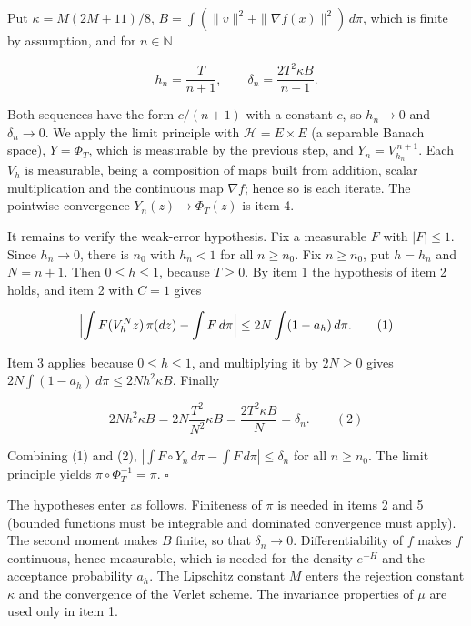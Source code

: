\documentclass[11pt,a4paper]{article}
\begin{document}
Put \(\kappa=M(2M+11)/8\), \(B=\int(\|v\|^2+\|\nabla f(x)\|^2)\,d\pi\), which is finite by assumption, and for \(n\in\mathbb N\)


\[h_n=\frac{T}{n+1},\qquad \delta_n=\frac{2T^2\kappa B}{n+1}.\]


Both sequences have the form \(c/(n+1)\) with a constant \(c\), so \(h_n\to0\) and \(\delta_n\to0\). We apply the limit principle with \(\mathcal H=E\times E\) (a separable Banach space), \(Y=\Phi_T\), which is measurable by the previous step, and \(Y_n=V_{h_n}^{\,n+1}\). Each \(V_h\) is measurable, being a composition of maps built from addition, scalar multiplication and the continuous map \(\nabla f\); hence so is each iterate. The pointwise convergence \(Y_n(z)\to\Phi_T(z)\) is item 4.




It remains to verify the weak-error hypothesis. Fix a measurable \(F\) with \(|F|\le1\). Since \(h_n\to0\), there is \(n_0\) with \(h_n<1\) for all \(n\ge n_0\). Fix \(n\ge n_0\), put \(h=h_n\) and \(N=n+1\). Then \(0\le h\le1\), because \(T\ge0\). By item 1 the hypothesis of item 2 holds, and item 2 with \(C=1\) gives


\[\Bigl|\int F(V_h^Nz)\,\pi(dz)-\int F\,d\pi\Bigr|\le 2N\int(1-a_h)\,d\pi .\qquad(1)\]


Item 3 applies because \(0\le h\le1\), and multiplying it by \(2N\ge0\) gives \(2N\int(1-a_h)\,d\pi\le2Nh^2\kappa B\). Finally


\[2Nh^2\kappa B=2N\frac{T^2}{N^2}\kappa B=\frac{2T^2\kappa B}{N}=\delta_n .\qquad(2)\]


Combining (1) and (2), \(|\int F\circ Y_n\,d\pi-\int F\,d\pi|\le\delta_n\) for all \(n\ge n_0\). The limit principle yields \(\pi\circ\Phi_T^{-1}=\pi\). \(\square\)




The hypotheses enter as follows. Finiteness of \(\pi\) is needed in items 2 and 5 (bounded functions must be integrable and dominated convergence must apply). The second moment makes \(B\) finite, so that \(\delta_n\to0\). Differentiability of \(f\) makes \(f\) continuous, hence measurable, which is needed for the density \(e^{-H}\) and the acceptance probability \(a_h\). The Lipschitz constant \(M\) enters the rejection constant \(\kappa\) and the convergence of the Verlet scheme. The invariance properties of \(\mu\) are used only in item 1.
\end{document}
